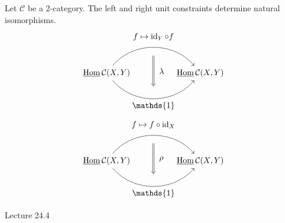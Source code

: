 \begin{prop}
	Let $ \mathcal{ C } $ be a 2-category. 
	The left and right unit constraints determine natural isomorphisms.
	\[
	\begin{tikzcd}
		\twoHom{ \mathcal{ C } } ( X , Y )
		\arrow[bend left=50]{rr}[name=U',label=above:$f\mapsto \id_Y \circ f$]{}
		\arrow[bend right=50]{rr}[name=D',label=below:$ \mathds{ 1 }$]{}
		&&
		\twoHom{ \mathcal{ C } } ( X , Y )
		\arrow[shorten <=10pt,shorten >=10pt,Rightarrow,to path={(U')-- node[label=right:$ \lambda $] {} (D')}]{}
	\end{tikzcd}
	\]
	\[
	\begin{tikzcd}
		\twoHom{ \mathcal{ C } } ( X , Y )
		\arrow[bend left=50]{rr}[name=U',label=above:$f\mapsto f \circ \id_X $]{}
		\arrow[bend right=50]{rr}[name=D',label=below:$ \mathds{ 1 }$]{}
		&&
		\twoHom{ \mathcal{ C } } ( X , Y )
		\arrow[shorten <=10pt,shorten >=10pt,Rightarrow,to path={(U')-- node[label=right:$ \rho $] {} (D')}]{}
	\end{tikzcd}
	\]
\end{prop}

Lecture 24.4

